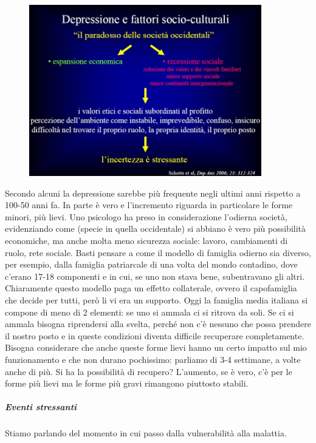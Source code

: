 \begin{figure}[!ht]
\centering
	\includegraphics[width=0.9\textwidth]{02/image9.jpeg}
\end{figure}

Secondo alcuni la depressione sarebbe più frequente negli ultimi anni
rispetto a 100-50 anni fa. In parte è vero e l'incremento riguarda in
particolare le forme minori, più lievi. Uno psicologo ha preso in
considerazione l'odierna società, evidenziando come (specie in quella
occidentale) si abbiano è vero più possibilità economiche, ma anche
molta meno sicurezza sociale: lavoro, cambiamenti di ruolo, rete
sociale. Basti pensare a come il modello di famiglia odierno sia
diverso, per esempio, dalla famiglia patriarcale di una volta del mondo
contadino, dove c'erano 17-18 componenti e in cui, se uno non stava
bene, subentravano gli altri. Chiaramente questo modello paga un effetto
collaterale, ovvero il capofamiglia che decide per tutti, però li vi era
un supporto. Oggi la famiglia media italiana si compone di meno di 2
elementi: se uno si ammala ci si ritrova da soli. Se ci si ammala
bisogna riprendersi alla svelta, perché non c'è nessuno che possa
prendere il nostro posto e in queste condizioni diventa difficile
recuperare completamente. Bisogna considerare che anche queste forme
lievi hanno un certo impatto sul mio funzionamento e che non durano
pochissimo: parliamo di 3-4 settimane, a volte anche di più. Si ha la
possibilità di recupero? L'aumento, se è vero, c'è per le forme più
lievi ma le forme più gravi rimangono piuttosto stabili.

\subparagraph{Eventi stressanti}

Stiamo parlando del momento in cui passo dalla vulnerabilità alla
malattia.

